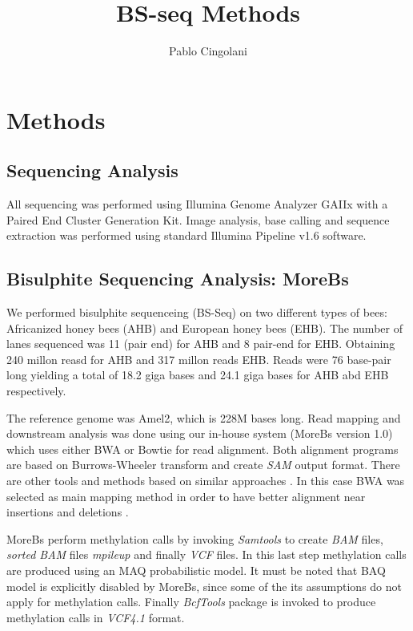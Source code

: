 \documentclass[10pt,a4paper]{article}
\begin{document}
\title{BS-seq Methods}
\author{Pablo Cingolani}
\date{}
\maketitle

\section{Methods}

\subsection{Sequencing Analysis}
All sequencing was performed using Illumina Genome Analyzer GAIIx with a Paired End Cluster Generation Kit. 
Image analysis, base calling and sequence extraction was performed using standard Illumina Pipeline v1.6 software.

\subsection{Bisulphite Sequencing Analysis: MoreBs}
We performed bisulphite sequenceing (BS-Seq) on two different types of bees: Africanized honey bees (AHB) and European honey bees (EHB).
The number of lanes sequenced was 11 (pair end) for AHB and 8 pair-end for EHB. Obtaining 240 millon reasd for AHB and 317 millon reads EHB. Reads were 76 base-pair long yielding a total of 18.2 giga bases and 24.1 giga bases for AHB abd EHB respectively.

The reference genome was Amel2, which is 228M bases long.
Read mapping and downstream analysis was done using our in-house system (MoreBs version 1.0) which uses either BWA\cite{li2010fast}\cite{li2010fastlong} or Bowtie\cite{langmead2009ultrafast} for read alignment. 
Both alignment programs are based on Burrows-Wheeler transform\cite{burrows1994block, li2010survey} and create \textit{SAM}\cite{li2009sequence} output format. There are other tools and methods based on similar approaches \cite{pao11bs, xi2009bsmap, samarakoon2009epigenomics}.
In this case BWA was selected as main mapping method in order to have better alignment near insertions and deletions \cite{bao2011evaluation}.

MoreBs perform methylation calls by invoking \textit{Samtools} to create \textit{BAM} files, \textit{sorted BAM} files \textit{mpileup} and finally \textit{VCF} files. 
In this last step methylation calls are produced using an MAQ\cite{li2008mapping} probabilistic model. 
It must be noted that BAQ\cite{li2010baq} model is explicitly disabled by MoreBs, since some of the its assumptions do not apply for methylation calls. 
Finally \textit{BcfTools} package is invoked to produce methylation calls in \textit{VCF4.1}\cite{vcf4broad} format.
\end{document}
